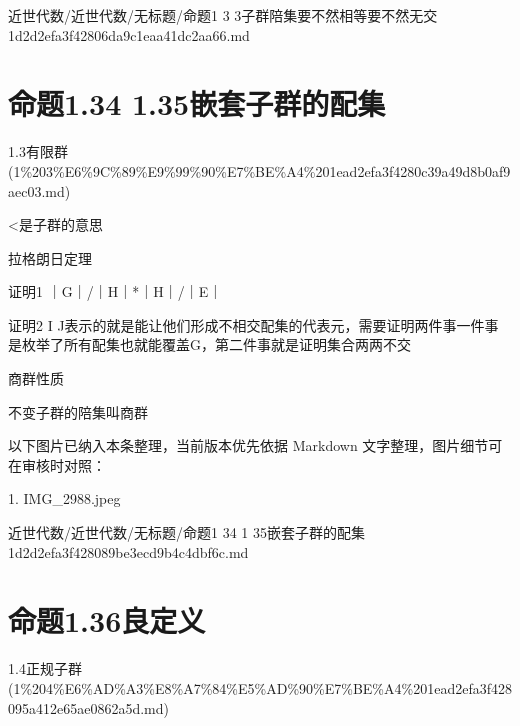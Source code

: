 \begin{note}[来源路径]

近世代数/近世代数/无标题/命题1 3 3子群陪集要不然相等要不然无交 1d2d2efa3f42806da9c1eaa41dc2aa66.md

\end{note}

\section*{命题1.34 1.35嵌套子群的配集}

\begin{note}[来源上级主题]

1.3有限群 (1\%203\%E6\%9C\%89\%E9\%99\%90\%E7\%BE\%A4\%201ead2efa3f4280c39a49d8b0af9aec03.md)

\end{note}

\begin{proposition}[命题1.34 1.35嵌套子群的配集]

<是子群的意思

拉格朗日定理

证明1 ｜G｜/｜H｜*｜H｜/｜E｜

证明2 I J表示的就是能让他们形成不相交配集的代表元，需要证明两件事一件事是枚举了所有配集也就能覆盖G，第二件事就是证明集合两两不交

商群性质

不变子群的陪集叫商群

\end{proposition}

\begin{note}[关联图片]
以下图片已纳入本条整理，当前版本优先依据 Markdown 文字整理，图片细节可在审核时对照：

1. IMG\_2988.jpeg\\

\end{note}

\begin{note}[来源路径]

近世代数/近世代数/无标题/命题1 34 1 35嵌套子群的配集 1d2d2efa3f428089be3ecd9b4c4dbf6c.md

\end{note}

\section*{命题1.36良定义}

\begin{note}[来源上级主题]

1.4正规子群 (1\%204\%E6\%AD\%A3\%E8\%A7\%84\%E5\%AD\%90\%E7\%BE\%A4\%201ead2efa3f428095a412e65ae0862a5d.md)

\end{note}

